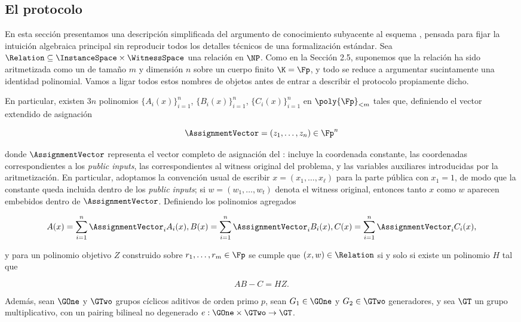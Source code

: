 
\subsection{El protocolo \Groth}

En esta sección presentamos una descripción simplificada del argumento de conocimiento subyacente al esquema \Groth, pensada para fijar la intuición algebraica principal sin reproducir todos los detalles técnicos de una formalización estándar. Sea $\Relation \subseteq \InstanceSpace \times \WitnessSpace$ una relación en $\NP$. Como en la Sección 2.5, suponemos que la relación ha sido aritmetizada como un \QAP de tamaño $m$ y dimensión $n$ sobre un cuerpo finito $\K = \Fp$, y todo se reduce a argumentar sucintamente una identidad polinomial. Vamos a ligar todos estos nombres de objetos antes de entrar a describir el protocolo propiamente dicho.

En particular, existen $3n$ polinomios $\{A_i(x)\}_{i=1}^n$, $\{B_i(x)\}_{i=1}^n$, $\{C_i(x)\}_{i=1}^n$ en $\poly{\Fp}_{< m}$ tales que, definiendo el vector extendido de asignación

$$\AssignmentVector = (z_1, \ldots, z_n) \in \Fp^n$$

donde $\AssignmentVector$ representa el vector completo de asignación del \QAP: incluye la coordenada constante, las coordenadas correspondientes a los \textit{public inputs}, las correspondientes al witness original del problema, y las variables auxiliares introducidas por la aritmetización. En particular, adoptamos la convención usual de escribir $x = (x_1, \ldots, x_\ell)$ para la parte pública con $x_1 = 1$, de modo que la constante queda incluida dentro de los \textit{public inputs}; si $w = (w_1, \ldots, w_t)$ denota el witness original, entonces tanto $x$ como $w$ aparecen embebidos dentro de $\AssignmentVector$. Definiendo los polinomios agregados

$$A(x) = \sum_{i=1}^n \AssignmentVector_i A_i(x), B(x) = \sum_{i=1}^n \AssignmentVector_i B_i(x), C(x) = \sum_{i=1}^n \AssignmentVector_i C_i(x),$$

y para un polinomio objetivo $Z$ construido sobre $r_1, \ldots, r_m \in \Fp$ se cumple que $(x, w) \in \Relation$ si y solo si existe un polinomio $H$ tal que

$$AB - C = HZ.$$

Además, sean $\GOne$ y $\GTwo$ grupos cíclicos aditivos de orden primo $p$, sean $G_1 \in \GOne$ y $G_2 \in \GTwo$ generadores, y sea $\GT$ un grupo multiplicativo, con un pairing bilineal no degenerado $e: \GOne \times \GTwo \to \GT$.

